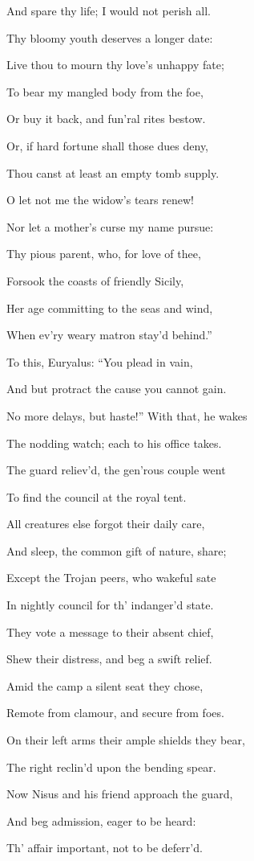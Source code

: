 And spare thy life; I would not perish all.

Thy bloomy youth deserves a longer date:

Live thou to mourn thy love’s unhappy fate;

To bear my mangled body from the foe,

Or buy it back, and fun’ral rites bestow.

Or, if hard fortune shall those dues deny,

Thou canst at least an empty tomb supply.

O let not me the widow’s tears renew!

Nor let a mother’s curse my name pursue:

Thy pious parent, who, for love of thee,

Forsook the coasts of friendly Sicily,

Her age committing to the seas and wind,

When ev’ry weary matron stay’d behind.”

To this, Euryalus: “You plead in vain,

And but protract the cause you cannot gain.

No more delays, but haste!” With that, he wakes

The nodding watch; each to his office takes.

The guard reliev’d, the gen’rous couple went

To find the council at the royal tent.

All creatures else forgot their daily care,

And sleep, the common gift of nature, share;

Except the Trojan peers, who wakeful sate

In nightly council for th’ indanger’d state.

They vote a message to their absent chief,

Shew their distress, and beg a swift relief.

Amid the camp a silent seat they chose,

Remote from clamour, and secure from foes.

On their left arms their ample shields they bear,

The right reclin’d upon the bending spear.

Now Nisus and his friend approach the guard,

And beg admission, eager to be heard:

Th’ affair important, not to be deferr’d.

